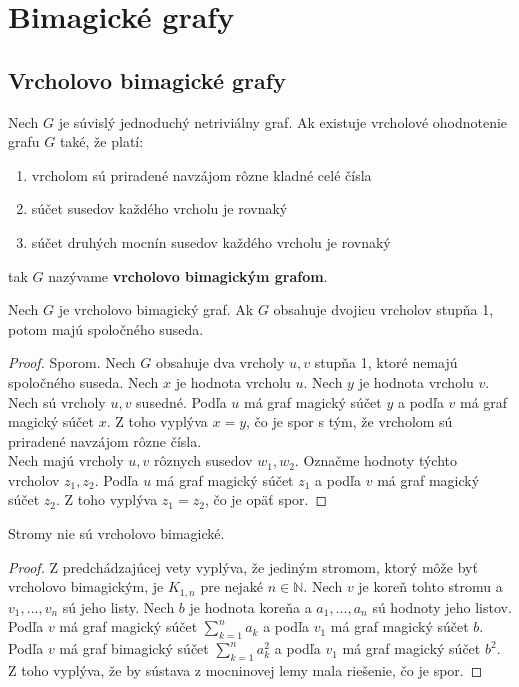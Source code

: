 \section{Bimagické grafy}

\subsection{Vrcholovo bimagické grafy}

\begin{subdefinition} Nech $G$ je súvislý jednoduchý netriviálny graf. Ak existuje vrcholové ohodnotenie grafu $G$ také, že platí:
\begin{enumerate}
\item vrcholom sú priradené navzájom rôzne kladné celé čísla
\item súčet susedov každého vrcholu je rovnaký
\item súčet druhých mocnín susedov každého vrcholu je rovnaký
\end{enumerate}
tak $G$ nazývame \textbf{vrcholovo bimagickým grafom}.
\end{subdefinition}

\begin{subtheorem}
\label{vbgdegree1}
Nech $G$ je vrcholovo bimagický graf. Ak $G$ obsahuje dvojicu vrcholov stupňa 1, potom majú spoločného suseda.
\end{subtheorem}

\begin{proof} Sporom. Nech $G$ obsahuje dva vrcholy $u,v$ stupňa 1, ktoré nemajú spoločného suseda. Nech $x$ je hodnota vrcholu $u$. Nech $y$ je hodnota vrcholu $v$. \\

Nech sú vrcholy $u,v$ susedné. Podľa $u$ má graf magický súčet $y$ a podľa $v$ má graf magický súčet $x$. Z toho vyplýva $x = y$, čo je spor s tým, že vrcholom sú priradené navzájom rôzne čísla. \\

Nech majú vrcholy $u,v$ rôznych susedov $w_1, w_2$. Označme hodnoty týchto vrcholov $z_1, z_2$. Podľa $u$ má graf magický súčet $z_1$ a podľa $v$ má graf magický súčet $z_2$. Z toho vyplýva $z_1 = z_2$, čo je opäť spor.
\end{proof} 

\begin{subconsequence} Stromy nie sú vrcholovo bimagické.
\end{subconsequence}

\begin{proof} Z predchádzajúcej vety vyplýva, že jediným stromom, ktorý môže byť vrcholovo bimagickým, je $K_{1,n}$ pre nejaké $n \in \mathbb{N}$. Nech $v$ je koreň tohto stromu a $v_1, ... , v_n$ sú jeho listy. Nech $b$ je hodnota koreňa a $a_1, ... , a_n$ sú hodnoty jeho listov. Podľa $v$ má graf magický súčet $\sum_{k=1}^{n} a_k$ a podľa $v_1$ má graf magický súčet $b$. Podľa $v$ má graf bimagický súčet $\sum_{k=1}^{n} a_k^2$ a podľa $v_1$ má graf magický súčet $b^2$. Z toho vyplýva, že by sústava z mocninovej lemy mala riešenie, čo je spor.
\end{proof} 


